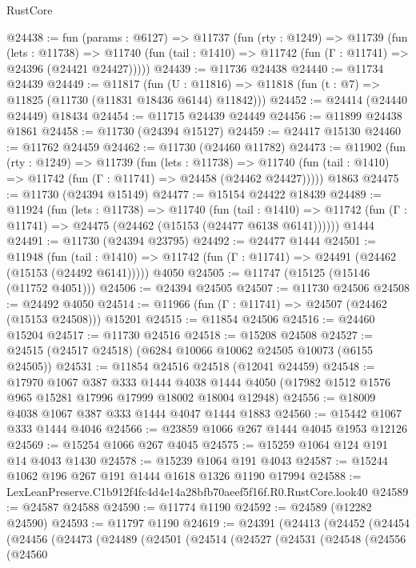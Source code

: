 \begin{lexlean}{RustCore}
\begin{coremodule}
@24438 := fun (params : @6127) =>
  @11737
    (fun (rty : @1249) =>
    @11739
      (fun (lets : @11738) =>
      @11740 (fun (tail : @1410) => @11742 (fun (Γ : @11741) => @24396 (@24421 @24427)))))
@24439 := @11736 @24438
@24440 := @11734 @24439
@24449 := @11817
    (fun (U : @11816) => @11818 (fun (t : @7) => @11825 (@11730 (@11831 @18436 @6144) @11842)))
@24452 := @24414 (@24440 @24449) @18434
@24454 := @11715 @24439 @24449
@24456 := @11899 @24438 @1861
@24458 := @11730 (@24394 @15127)
@24459 := @24417 @15130
@24460 := @11762 @24459
@24462 := @11730 (@24460 @11782)
@24473 := @11902
    (fun (rty : @1249) =>
    @11739
      (fun (lets : @11738) =>
      @11740 (fun (tail : @1410) => @11742 (fun (Γ : @11741) => @24458 (@24462 @24427)))))
    @1863
@24475 := @11730 (@24394 @15149)
@24477 := @15154 @24422 @18439
@24489 := @11924
    (fun (lets : @11738) =>
    @11740
      (fun (tail : @1410) =>
      @11742 (fun (Γ : @11741) => @24475 (@24462 (@15153 (@24477 @6138 @6141))))))
    @1444
@24491 := @11730 (@24394 @23795)
@24492 := @24477 @1444
@24501 := @11948
    (fun (tail : @1410) => @11742 (fun (Γ : @11741) => @24491 (@24462 (@15153 (@24492 @6141)))))
    @4050
@24505 := @11747 (@15125 (@15146 (@11752 @4051)))
@24506 := @24394 @24505
@24507 := @11730 @24506
@24508 := @24492 @4050
@24514 := @11966 (fun (Γ : @11741) => @24507 (@24462 (@15153 @24508))) @15201
@24515 := @11854 @24506
@24516 := @24460 @15204
@24517 := @11730 @24516
@24518 := @15208 @24508
@24527 := @24515 (@24517 @24518) (@6284 @10066 @10062 @24505 @10073 (@6155 @24505))
@24531 := @11854 @24516 @24518 (@12041 @24459)
@24548 := @17970
    @1067
    @387
    @333
    @1444
    @4038
    @1444
    @4050
    (@17982 @1512 @1576 @965 @15281 @17996 @17999 @18002 @18004 @12948)
@24556 := @18009 @4038 @1067 @387 @333 @1444 @4047 @1444 @1883
@24560 := @15442 @1067 @333 @1444 @4046
@24566 := @23859 @1066 @267 @1444 @4045 @1953 @12126
@24569 := @15254 @1066 @267 @4045
@24575 := @15259 @1064 @124 @191 @14 @4043 @1430
@24578 := @15239 @1064 @191 @4043
@24587 := @15244 @1062 @196 @267 @191 @1444 @1618 @1326 @1190 @17994
@24588 := LexLeanPreserve.C1b912f4fc4d4e14a28bfb70aeef5f16f.R0.RustCore.look40
@24589 := @24587 @24588
@24590 := @11774 @1190
@24592 := @24589 (@12282 @24590)
@24593 := @11797 @1190
@24619 := @24391
    (@24413
      (@24452
        (@24454
          (@24456
            (@24473
              (@24489
                (@24501
                  (@24514
                    (@24527
                      (@24531
                        (@24548
                          (@24556
                            (@24560

\end{coremodule}
\end{lexlean}
